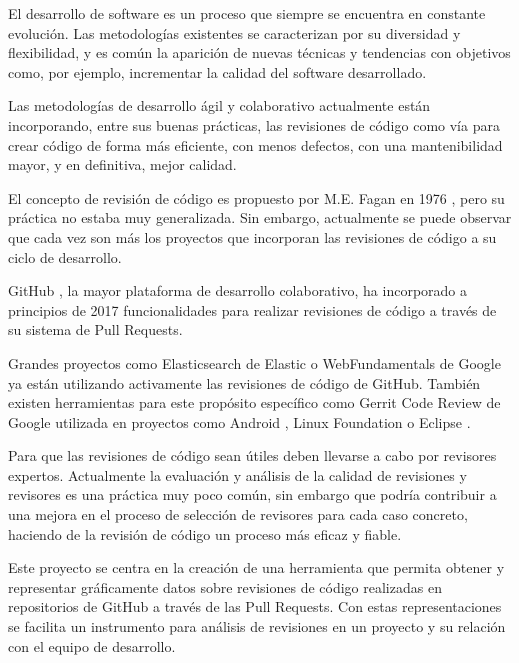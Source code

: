 
El desarrollo de software es un proceso que siempre se encuentra en constante evolución. Las metodologías existentes se caracterizan por su diversidad y flexibilidad, y es común la aparición de nuevas técnicas y tendencias con objetivos como, por ejemplo, incrementar la calidad del software desarrollado.

Las metodologías de desarrollo ágil y colaborativo actualmente están incorporando, entre sus buenas prácticas, las revisiones de código como vía para crear código de forma más eficiente, con menos defectos, con una mantenibilidad mayor, y en definitiva, mejor calidad.

El concepto de revisión de código es propuesto por M.E. Fagan en 1976 \cite{5388086}, pero su práctica no estaba muy generalizada. Sin embargo, actualmente se puede observar que cada vez son más los proyectos que incorporan las revisiones de código a su ciclo de desarrollo.

GitHub \cite{github:home}, la mayor plataforma de desarrollo colaborativo, ha incorporado a principios de 2017 funcionalidades para realizar revisiones de código a través de su sistema de Pull Requests.


Grandes proyectos como Elasticsearch \cite{elastic:elasticsearch} de Elastic o WebFundamentals \cite{google:webfundamentals} de Google ya están utilizando activamente las revisiones de código de GitHub. También existen herramientas para este propósito específico como Gerrit Code Review \cite{gerrit:home} de Google utilizada en proyectos como Android \cite{android:home}, Linux Foundation \cite{linuxfoundation:home} o Eclipse \cite{eclipse:home}.

Para que las revisiones de código sean útiles deben llevarse a cabo por revisores expertos. Actualmente la evaluación y análisis de la calidad de revisiones y revisores es una práctica muy poco común, sin embargo que podría contribuir a una mejora en el proceso de selección de revisores para cada caso concreto, haciendo de la revisión de código un proceso más eficaz y fiable.


Este proyecto se centra en la creación de una herramienta que permita obtener y representar gráficamente datos sobre revisiones de código realizadas en repositorios de GitHub a través de las Pull Requests. Con estas representaciones se facilita un instrumento para análisis de revisiones en un proyecto y su relación con el equipo de desarrollo.

